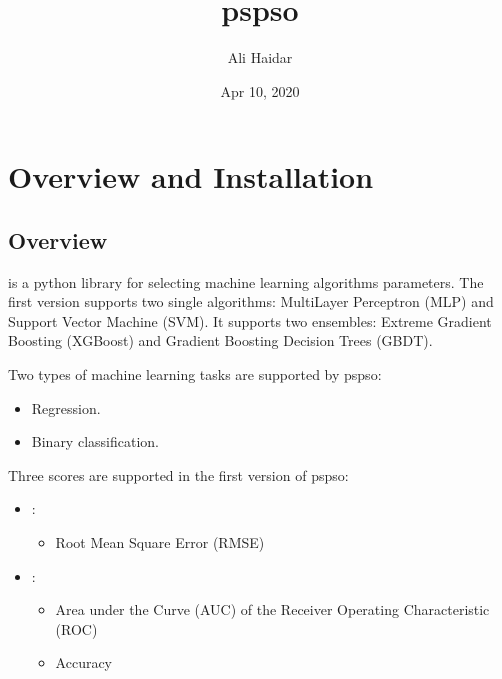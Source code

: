 \documentclass[letterpaper,10pt,english]{sphinxmanual}
\title{pspso}
\date{Apr 10, 2020}
\author{Ali Haidar}
\begin{document}
\pagestyle{empty}
\sphinxmaketitle
\pagestyle{plain}
\sphinxtableofcontents
\pagestyle{normal}
\label{\detokenize{index::doc}}




\chapter{Overview and Installation}
\label{\detokenize{index:overview-and-installation}}

\section{Overview}
\label{\detokenize{index:overview}}
 is a python library for selecting machine learning algorithms
parameters. The first version supports two single algorithms:
Multi\sphinxhyphen{}Layer Perceptron (MLP) and Support Vector Machine (SVM). It
supports two ensembles: Extreme Gradient Boosting (XGBoost) and Gradient
Boosting Decision Trees (GBDT).

Two types of machine learning tasks are supported by pspso:
\begin{itemize}
\item {} 
Regression.

\item {} 
Binary classification.

\end{itemize}

Three scores are supported in the first version of pspso:
\begin{itemize}
\item {} 
 :
\begin{itemize}
\item {} 
Root Mean Square Error (RMSE)

\end{itemize}

\item {} 
 :
\begin{itemize}
\item {} 
Area under the Curve (AUC) of the Receiver Operating Characteristic (ROC)

\item {} 
Accuracy

\end{itemize}

\end{itemize}
\end{document}
